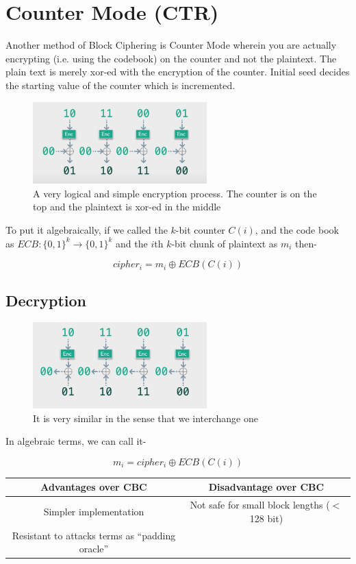 	\section{Counter Mode (CTR)}
		Another method of Block Ciphering is Counter Mode wherein you are actually encrypting (i.e. using the codebook) on the counter and not the plaintext. The plain text is merely xor-ed with the encryption of the counter. Initial seed decides the starting value of the counter which is incremented.
		\begin{figure}
			\caption{A very logical and simple encryption process. The counter is on the top and the plaintext is xor-ed in the middle}
			\includegraphics[width=0.6\textwidth]{Photos/CBC_4.png}
		\end{figure}
		
		To put it algebraically, if we called the $k$-bit counter \(C(i)\), and the code book as \(ECB: \{0,1\}^{k} \rightarrow\{0,1\}^k\) and the \(i\)th $k$-bit chunk of plaintext as \(m_i\) then- 
		\begin{mybox}
		\[cipher_i=m_i \oplus ECB(C(i))\]
		\end{mybox}

		\subsection{Decryption}
			\begin{figure}
				\caption{It is very similar in the sense that we interchange one }
				\includegraphics[width=0.6\textwidth]{Photos/CBC_6.png}
			\end{figure}
			In algebraic terms, we can call it- 
			\begin{mybox}
				\[m_i= cipher_i \oplus ECB(C(i))\]
			\end{mybox}

			\begin{center}
			\begin{tabular}{c | c}
				 \hline
				 Advantages over CBC&Disadvantage over CBC\\ 
				 \hline
				 Simpler implementation & Not safe for small block lengths (\(<\)128 bit)\\
				 Resistant to attacks terms as ``padding oracle''& \\
				 \hline  
			\end{tabular}
			\end{center}


